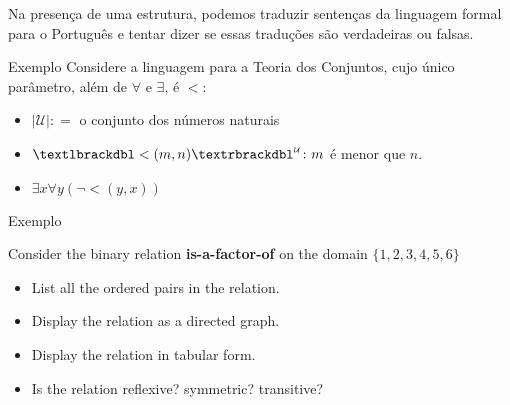 \documentclass{beamer}
\begin{document}
\begin{frame}

  Na presença de uma estrutura, podemos traduzir sentenças da
  linguagem formal para o Portugu\^es e tentar dizer se essas
  tradu\c{c}\~oes s\~ao verdadeiras ou falsas.

  \begin{exampleblock}{Exemplo}
    Considere a linguagem para a Teoria dos Conjuntos, cujo \'unico
    par\^ametro, al\'em de $\forall$ e $\exists$, \'e $<$:

    \begin{itemize}
    \item $|\mathcal U|\colon =$ o conjunto dos n\'umeros naturais
    \item $\textlbrackdbl <(m,n)\textrbrackdbl^{\scriptscriptstyle\mathcal U}\colon m$ \'e menor que $n$.
      \vspace{1cm}
    \item $\exists x\forall y (\neg<(y,x))$
    \end{itemize}
  \end{exampleblock}
\end{frame}

\begin{frame}{Exemplo}

  Consider the binary relation \textbf{is-a-factor-of} on the domain
  $\{1,2,3,4,5,6\}$
  
  \begin{itemize}
    \item List all the ordered pairs in the relation.
    \item Display the relation as a directed graph.
    \item Display the relation in tabular form.
    \item Is the relation reflexive? symmetric? transitive?
  \end{itemize}
\end{frame}
\end{document}
